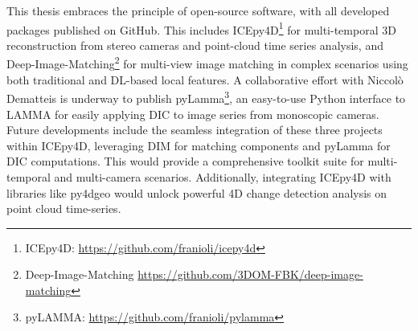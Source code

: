 This thesis embraces the principle of open-source software, with all developed packages published on GitHub.
This includes ICEpy4D\footnote{ICEpy4D: \url{https://github.com/franioli/icepy4d}} for multi-temporal 3D reconstruction from stereo cameras and point-cloud time series analysis, and Deep-Image-Matching\footnote{Deep-Image-Matching \url{https://github.com/3DOM-FBK/deep-image-matching}} for multi-view image matching in complex scenarios using both traditional and DL-based local features.  
A collaborative effort with Niccolò Dematteis is underway to publish pyLamma\footnote{pyLAMMA: \url{https://github.com/franioli/pylamma}}, an easy-to-use Python interface to LAMMA \cite{Dematteis2022} for easily applying DIC to image series from monoscopic cameras. 
Future developments include the seamless integration of these three projects within ICEpy4D, leveraging DIM for matching components and pyLamma for DIC computations. 
This would provide a comprehensive toolkit suite for multi-temporal and multi-camera scenarios. 
Additionally, integrating ICEpy4D with libraries like py4dgeo \cite{Anders2021_py4dgeo, Winiwarter2023_kalman} would unlock powerful 4D change detection analysis on point cloud time-series.



\makechapterbibliography{}